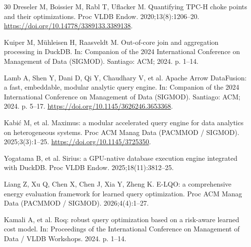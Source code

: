 \documentclass[10pt,a4paper]{article}
\begin{document}
\begin{thebibliography}{30}
Dreseler M, Boissier M, Rabl T, Uflacker M. Quantifying TPC-H choke points and their optimizations. Proc VLDB Endow. 2020;13(8):1206--20. \url{https://doi.org/10.14778/3389133.3389138}.

Kuiper M, M{\"u}hleisen H, Raasveldt M. Out-of-core join and aggregation processing in DuckDB. In: Companion of the 2024 International Conference on Management of Data (SIGMOD). Santiago: ACM; 2024. p. 1--14.

Lamb A, Shen Y, Dani D, Qi Y, Chaudhary V, et al. Apache Arrow DataFusion: a fast, embeddable, modular analytic query engine. In: Companion of the 2024 International Conference on Management of Data (SIGMOD). Santiago: ACM; 2024. p. 5--17. \url{https://doi.org/10.1145/3626246.3653368}.


 Kabi\'{c} M, et al. Maximus: a modular accelerated query engine for data analytics on heterogeneous systems. Proc ACM Manag Data (PACMMOD / SIGMOD). 2025;3(3):1--25. \url{https://doi.org/10.1145/3725350}.

 Yogatama B, et al. Sirius: a GPU-native database execution engine integrated with DuckDB. Proc VLDB Endow. 2025;18(11):3812--25.

 Liang Z, Xu Q, Chen X, Chen J, Xia Y, Zheng K. E-LQO: a comprehensive energy evaluation framework for learned query optimization. Proc ACM Manag Data (PACMMOD / SIGMOD). 2026;4(4):1--27.

 Kamali A, et al. Roq: robust query optimization based on a risk-aware learned cost model. In: Proceedings of the International Conference on Management of Data / VLDB Workshops. 2024. p. 1--14.

\end{thebibliography}

\end{document}
